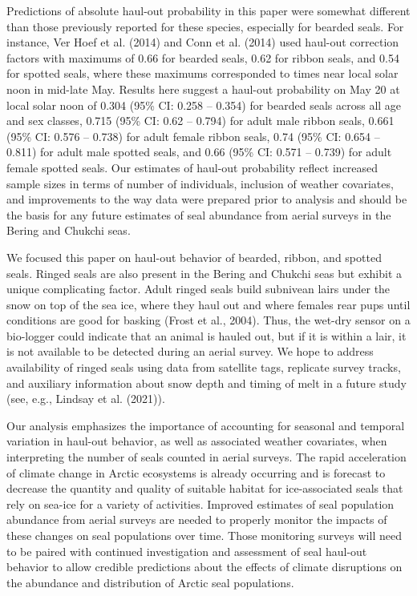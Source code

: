 \documentclass[fleqn,10pt,lineno]{wlpeerj} %
\begin{document}
Predictions of absolute haul-out probability in this paper were somewhat
different than those previously reported for these species, especially for
bearded seals. For instance, Ver Hoef et al. (2014) and Conn et al.
(2014) used haul-out correction factors with maximums of 0.66 for bearded
seals, 0.62 for ribbon seals, and 0.54 for spotted seals, where these maximums
corresponded to times near local solar noon in mid-late May. Results here
suggest a haul-out probability on May 20 at local solar noon of 0.304
(95\% CI: 0.258 -- 0.354)
for bearded seals across all age and sex classes,
0.715
(95\% CI: 0.62 -- 0.794) for
adult male ribbon seals, 0.661
(95\% CI: 0.576 -- 0.738) for
adult female ribbon seals, 0.74
(95\% CI: 0.654 -- 0.811) for
adult male spotted seals, and 0.66
(95\% CI: 0.571 -- 0.739) for
adult female spotted seals. Our estimates
of haul-out probability reflect increased sample sizes in terms of
number of individuals, inclusion of weather covariates, and improvements to the
way data were prepared prior to analysis and should be the basis for any
future estimates of seal abundance from aerial surveys in the Bering and
Chukchi seas.

We focused this paper on haul-out behavior of bearded, ribbon, and spotted
seals. Ringed seals are also present in the Bering and Chukchi seas but exhibit
a unique complicating factor. Adult ringed seals build subnivean lairs under the
snow on top of the sea ice, where they haul out and where females rear pups
until conditions are good for basking (Frost et al., 2004). Thus, the wet-dry sensor on
a bio-logger could indicate that an animal is hauled out, but if it is within a
lair, it is not available to be detected during an aerial survey. We hope to
address availability of ringed seals using data from satellite tags, replicate
survey tracks, and auxiliary information about snow depth and timing of melt in
a future study (see, e.g., Lindsay et al. (2021)).

Our analysis emphasizes the importance of accounting for seasonal and temporal
variation in haul-out behavior, as well as associated weather covariates,
when interpreting the number of seals counted in aerial surveys. The rapid
acceleration of climate change in Arctic ecosystems is already occurring and is
forecast to decrease the quantity and quality of suitable habitat for
ice-associated seals that rely on sea-ice for a variety of activities. Improved
estimates of seal population abundance from aerial surveys are needed to
properly monitor the impacts of these changes on seal populations over time.
Those monitoring surveys will need to be paired with continued investigation and
assessment of seal haul-out behavior to allow credible predictions about the
effects of climate disruptions on the abundance and distribution of Arctic seal
populations.
\end{document}
